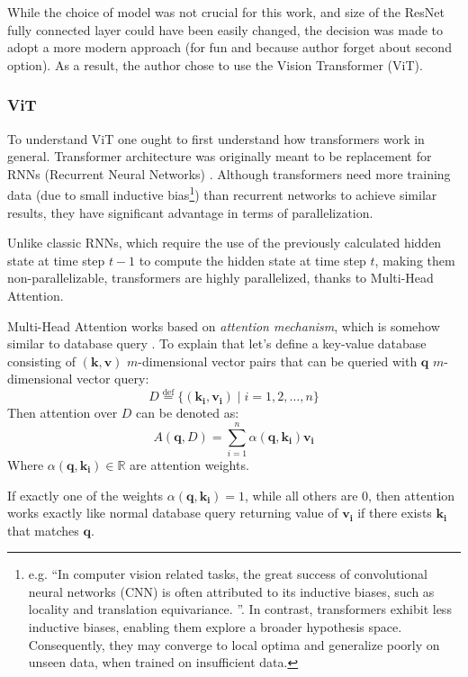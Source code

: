 While the choice of model was not crucial for this work, and size of the ResNet fully connected layer could have been easily changed, the decision was made to adopt a more modern approach (for fun and because author forget about second option). 
As a result, the author chose to use the Vision Transformer (ViT).

\subsubsection{ViT}
To understand ViT one ought to first understand how transformers work in general.
Transformer architecture was originally meant to be replacement for RNNs (Recurrent Neural Networks) \cite{Vaswani2017}.
Although transformers need more training data (due to small inductive bias\footnote{e.g. ``In computer vision related tasks, the great success of convolutional neural networks (CNN) is often attributed to its inductive biases, such as locality and translation equivariance. \cite{Mormille2023}''. 
In contrast, transformers exhibit less inductive biases, enabling them explore a broader hypothesis space. 
Consequently, they may converge to local optima and generalize poorly on unseen data, when trained on insufficient data.}) 
than recurrent networks to achieve similar results, they have significant advantage in terms of parallelization.

Unlike classic RNNs, which require the use of the previously calculated hidden state at time step $t-1$ to compute the hidden state at time step $t$, making them non-parallelizable, transformers are highly parallelized, thanks to Multi-Head Attention.

Multi-Head Attention works based on \emph{attention mechanism}, which is somehow similar to database query \cite{d2lAttentionMechanism}.
To explain that let's define a key-value database consisting of $(\mathbf{k}, \textbf{v})$ $m$-dimensional vector pairs that can be queried with $\mathbf{q}$ $m$-dimensional vector query: \[ D\overset{\text{def}}{=}\{(\mathbf{k_i}, \mathbf{v_i}) \mid i = 1, 2, \ldots, n\}\]
Then attention over $D$ can be denoted as:
\[ A(\mathbf{q}, D) = \sum_{i=1}^{n}\alpha(\mathbf{q}, \mathbf{k_i})\mathbf{v_i} \]
Where $\alpha(\mathbf{q}, \mathbf{k_i}) \in \mathbb{R}$ are attention weights.

If exactly one of the weights $\alpha(\mathbf{q},\mathbf{k_i}) = 1$, while all others are $0$, then attention works exactly like normal database query returning value of $\mathbf{v_i}$ if there exists $\mathbf{k_i}$ that matches $\mathbf{q}$.

